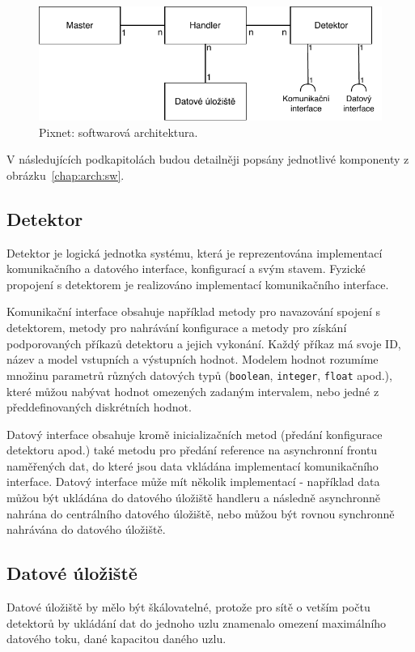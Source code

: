 \begin{figure}[h]
	\begin{center}
		\includegraphics[width=14.5cm]{figures/arch_sw.pdf}
		\caption{Pixnet: softwarová architektura.}
		\label{fig:arch:sw_architecture}
	\end{center}
\end{figure}

V následujících podkapitolách budou detailněji popsány jednotlivé komponenty z obrázku~\ref{chap:arch:sw}.
\subsection{Detektor}\label{chap:arch:sw:detector}
Detektor je logická jednotka systému, která je reprezentována implementací komunikačního a datového interface, konfigurací a svým stavem. Fyzické propojení s detektorem je realizováno implementací komunikačního interface.

Komunikační interface obsahuje například metody pro navazování spojení s detektorem, metody pro nahrávání konfigurace a metody pro získání podporovaných příkazů detektoru a jejich vykonání. Každý příkaz má svoje ID, název a model vstupních a výstupních hodnot. Modelem hodnot rozumíme množinu parametrů různých datových typů (\texttt{boolean}, \texttt{integer}, \texttt{float} apod.), které můžou nabývat hodnot omezených zadaným intervalem, nebo jedné z předdefinovaných diskrétních hodnot.

Datový interface obsahuje kromě inicializačních metod (předání konfigurace detektoru apod.) také metodu pro předání reference na asynchronní frontu naměřených dat, do které jsou data vkládána implementací komunikačního interface. Datový interface může mít několik implementací - například data můžou být ukládána do datového úložiště handleru a následně asynchronně nahrána do centrálního datového úložiště, nebo můžou být rovnou synchronně nahrávána do datového úložiště.

\subsection{Datové úložiště}
Datové úložiště by mělo být škálovatelné, protože pro sítě o vetším počtu detektorů by ukládání dat do jednoho uzlu znamenalo omezení maximálního datového toku, dané kapacitou daného uzlu.


